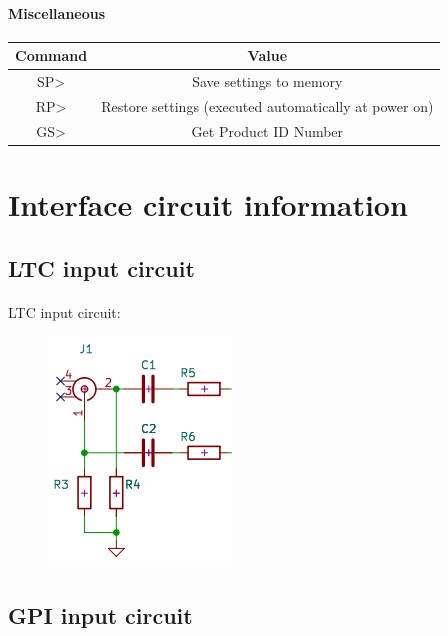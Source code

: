 \documentclass{article}
\begin{document}
			\paragraph{Miscellaneous}\label{miscellaneous}
				\begin{center}
					\begin{tabular}{|c|c|}
						\hline
						Command & Value \\
						\hline
						SP\textgreater{} & Save settings to memory \\
						RP\textgreater{} & Restore settings (executed automatically at power on) \\
						GS\textgreater{} & Get Product ID Number \\
						\hline
					\end{tabular}
				\end{center}
	
	\newpage
	\section{Interface circuit information}\label{interface-circuit-information}
	
		\subsection{LTC input circuit}\label{ltc-input-circuit}
			\paragraph{}LTC input circuit: 
				\begin{figure}[!h] %
					\centering
					\includegraphics[keepaspectratio]{imgs/LTC_input.png}
				\end{figure}

	\subsection{GPI input circuit}\label{gpi-input-circuit}
\end{document}
